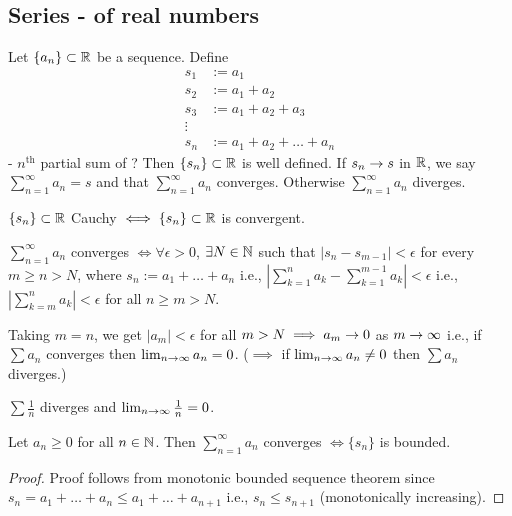 \documentclass[]{article}
\begin{document}
\subsection{Series - of real numbers}

Let $\{a_n\}\subset\mathbb{R}$ be a sequence.
Define
\begin{align*}
	s_1 &:= a_1 \\
	s_2 &:= a_1 + a_2 \\
	s_3 &:= a_1 + a_2 + a_3 \\
	\vdots \\
	s_n &:= a_1 + a_2 + \dots + a_n
\end{align*}
- $n^\text{th}$ partial sum of ?
Then $\{s_n\}\subset\mathbb{R}$ is well defined.
If $s_n\rightarrow s$ in $\mathbb{R}$, we say $\sum_{n=1}^\infty a_n = s$ and that $\sum_{n=1}^\infty a_n$ converges.
Otherwise $\sum_{n=1}^\infty a_n$ diverges.

\begin{recall}
	$\{s_n\}\subset\mathbb{R}$ Cauchy $\iff\{s_n\}\subset\mathbb{R}$ is convergent.
\end{recall}
\begin{theorem}
	$\sum_{n=1}^\infty a_n$ converges $\iff \forall\epsilon>0$, $\exists N\in\mathbb{N}$ such that $|s_n-s_{m-1}|<\epsilon$ for every $m\geq n>N$, where $s_n:=a_1+\dots+a_n$
	i.e., $\left|\sum_{k=1}^n a_k - \sum_{k=1}^{m-1} a_k\right|< \epsilon$
	i.e., $\left|\sum_{k=m}^n a_k\right| < \epsilon$ for all $n\geq m>N$.
\end{theorem}
\begin{note}
	Taking $m=n$, we get $|a_m|<\epsilon$ for all $m>N \implies a_m\rightarrow 0$ as $m\rightarrow\infty$ i.e., if $\sum a_n$ converges then $\lim_{n\rightarrow\infty}a_n=0$. ($\implies$ if $\lim_{n\rightarrow\infty}a_n\neq0$ then $\sum a_n$ diverges.)
\end{note}
\begin{example}
	$\sum\frac{1}{n}$ diverges and $\lim_{n\rightarrow\infty}\frac{1}{n}=0$.
\end{example}

\begin{theorem}
	Let $a_n\geq 0$ for all $n\in\mathbb{N}$.
	Then $\sum_{n=1}^\infty a_n$ converges $\iff \{s_n\}$ is bounded.
\end{theorem}
\begin{proof}
	Proof follows from monotonic bounded sequence theorem since $s_n=a_1+\dots+a_n\leq a_1+\dots+a_{n+1}$ i.e., $s_n\leq s_{n+1}$ (monotonically increasing).
\end{proof}
\end{document}
